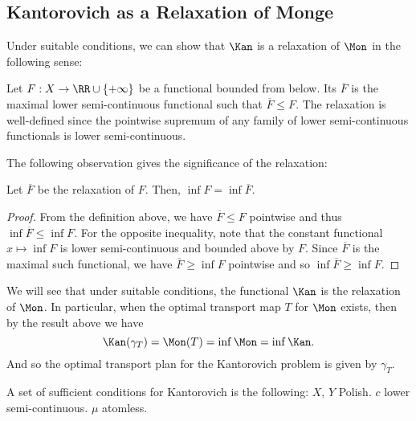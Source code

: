 \documentclass[oneside,reqno,letterpaper]{amsart}
\begin{document}
\subsection{Kantorovich as a Relaxation of Monge}
Under suitable conditions, we can show that \(\Kan\) is a relaxation of \(\Mon\) in the following sense:
\begin{definition}[Relaxation]
  Let \(F: X \to \RR \cup \left\{+\infty\right\}\) be a functional bounded from below.
  Its  \(\overline{F}\) is the maximal lower semi-continuous functional such that \(\overline{F} \leq F\).
  The relaxation is well-defined since the pointwise supremum of any family of lower semi-continuous functionals is lower semi-continuous.
\end{definition}

The following observation gives the significance of the relaxation:
\begin{proposition}
  Let \(\overline{F}\) be the relaxation of \(F\).
  Then, \(\inf F = \inf \overline{F}\).
\end{proposition}
\begin{proof}
  From the definition above, we have \(\overline{F} \leq F\) pointwise and thus \(\inf \overline{F} \leq \inf F\).
  For the opposite inequality, note that the constant functional \(x \mapsto \inf F\) is lower semi-continuous and bounded above by \(F\).
  Since \(\overline{F}\) is the maximal such functional, we have \(\overline{F} \geq \inf F\) pointwise and so \(\inf \overline{F} \geq \inf F\).
\end{proof}


We will see that under suitable conditions, the functional \(\Kan\) is the relaxation of \(\Mon\).
In particular, when the optimal transport map \(T\) for \(\Mon\) exists, then by the result above we have
\[
  \Kan(\gamma_T)
  = \Mon(T)
  = \inf \Mon
  = \inf \Kan.
\]
And so the optimal transport plan for the Kantorovich problem is given by \(\gamma_T\).



\begin{itodo}
A set of sufficient conditions for Kantorovich is the following:
\(X\), \(Y\) Polish.
\(c\) lower semi-continuous.
\(\mu\) atomless.
\end{itodo}
\end{document}
